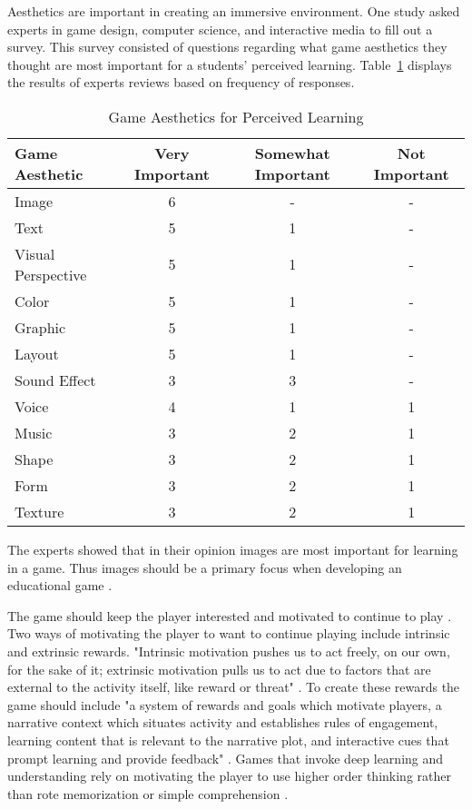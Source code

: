 Aesthetics are important in creating an immersive environment. One study asked experts in game design, computer science, and interactive media to fill out a survey. This survey consisted of questions regarding what game aesthetics they thought are most important for a students' perceived learning. Table~\ref{tbl:AestheticsPerceivedLearning} displays the results of experts reviews based on frequency of responses. 
\begin{table}[!ht]
	\begin{center}
		\caption{Game Aesthetics for Perceived Learning \cite{AbuBakar2017}\label{tbl:AestheticsPerceivedLearning}}
		\begin{tabular}{|l|c|c|c|}
			\hline 
			Game Aesthetic & Very Important & Somewhat Important & Not Important  \\ 
			\hline 
			Image & 6 & - & - \\ 
			\hline 
			Text & 5 & 1 & - \\ 
			\hline 
			Visual Perspective & 5 & 1 & - \\ 
			\hline 
			Color & 5 & 1 & - \\ 
			\hline 
			Graphic & 5 & 1 & - \\ 
			\hline 
			Layout & 5 & 1 & - \\ 
			\hline 
			Sound Effect & 3 & 3 & - \\ 
			\hline 
			Voice & 4 & 1 & 1 \\ 
			\hline 
			Music & 3 & 2 & 1 \\ 
			\hline 
			Shape & 3 & 2 & 1 \\ 
			\hline 
			Form & 3 & 2 & 1 \\ 
			\hline 
			Texture & 3 & 2 & 1 \\ 
			\hline 
		\end{tabular}
	\end{center}
\end{table}The experts showed that in their opinion images are most important for learning in a game. Thus images  should be a primary focus when developing an educational game \cite{AbuBakar2017}. 


The game should keep the player interested and motivated to continue to play \cite{Tobias2014}. Two ways of motivating the player to want to continue playing include intrinsic and extrinsic rewards. "Intrinsic motivation pushes us to act freely, on our own, for the sake of it; extrinsic motivation pulls us to act due to factors that are external to the activity itself, like reward or threat" \cite{Cataldo}. To create these rewards the game should include "a system of rewards and goals which motivate players, a narrative context which situates activity and establishes rules of engagement, learning content that is relevant to the narrative plot, and interactive cues that prompt learning and provide feedback" \cite{Cataldo}. Games that invoke deep learning and understanding rely on motivating the player to use higher order thinking rather than rote memorization or simple comprehension \cite{Cataldo}. 


